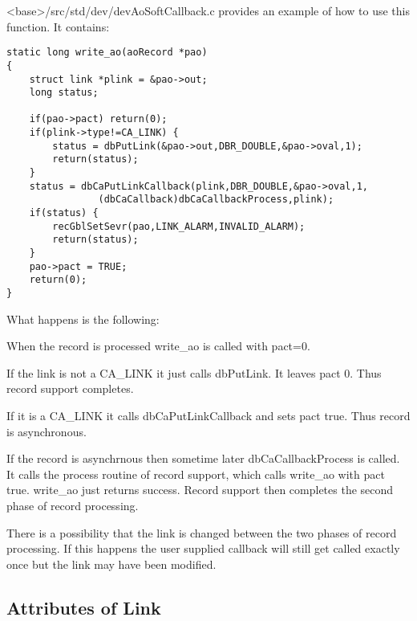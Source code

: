 \textless{}base\textgreater{}/src/std/dev/devAoSoftCallback.c provides an example of how to use this function. It contains:

\begin{verbatim}
static long write_ao(aoRecord *pao)
{
    struct link *plink = &pao->out;
    long status;

    if(pao->pact) return(0);
    if(plink->type!=CA_LINK) {
        status = dbPutLink(&pao->out,DBR_DOUBLE,&pao->oval,1);
        return(status);
    }
    status = dbCaPutLinkCallback(plink,DBR_DOUBLE,&pao->oval,1,
                (dbCaCallback)dbCaCallbackProcess,plink);
    if(status) {
        recGblSetSevr(pao,LINK_ALARM,INVALID_ALARM);
        return(status);
    }
    pao->pact = TRUE;
    return(0);
}
\end{verbatim}

What happens is the following:

\begin{description}

\item When the record is processed write\_ao is called with pact=0.

\begin{description}

\item If the link is not a CA\_LINK it just calls dbPutLink. It leaves pact 0. Thus record support completes.

\item If it is a CA\_LINK it calls dbCaPutLinkCallback and sets pact true. Thus record is asynchronous.

\end{description}

\item If the record is asynchrnous then sometime later dbCaCallbackProcess is called. It calls the process routine of record support, which calls write\_ao with pact true. write\_ao just returns success. Record support then completes the second phase of record processing.

\end{description}

There is a possibility that the link is changed between the two phases of record processing. If this happens the user supplied callback will still get called exactly once but the link may have been modified.

\subsection{Attributes of Link}

